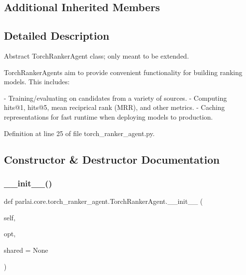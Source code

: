 \subsection*{Additional Inherited Members}


\subsection{Detailed Description}
\begin{DoxyVerb}Abstract TorchRankerAgent class; only meant to be extended.

TorchRankerAgents aim to provide convenient functionality for building ranking
models. This includes:

- Training/evaluating on candidates from a variety of sources.
- Computing hits@1, hits@5, mean reciprical rank (MRR), and other metrics.
- Caching representations for fast runtime when deploying models to production.
\end{DoxyVerb}
 

Definition at line 25 of file torch\+\_\+ranker\+\_\+agent.\+py.



\subsection{Constructor \& Destructor Documentation}
\mbox{\label{classparlai_1_1core_1_1torch__ranker__agent_1_1TorchRankerAgent_acde404a79bf3678bb52d3e6c3ee5244a}} 
\subsubsection{\texorpdfstring{\+\_\+\+\_\+init\+\_\+\+\_\+()}{\_\_init\_\_()}}
{\footnotesize\ttfamily def parlai.\+core.\+torch\+\_\+ranker\+\_\+agent.\+Torch\+Ranker\+Agent.\+\_\+\+\_\+init\+\_\+\+\_\+ (\begin{DoxyParamCaption}\item[{}]{self,  }\item[{}]{opt,  }\item[{}]{shared = {\ttfamily None} }\end{DoxyParamCaption})}



